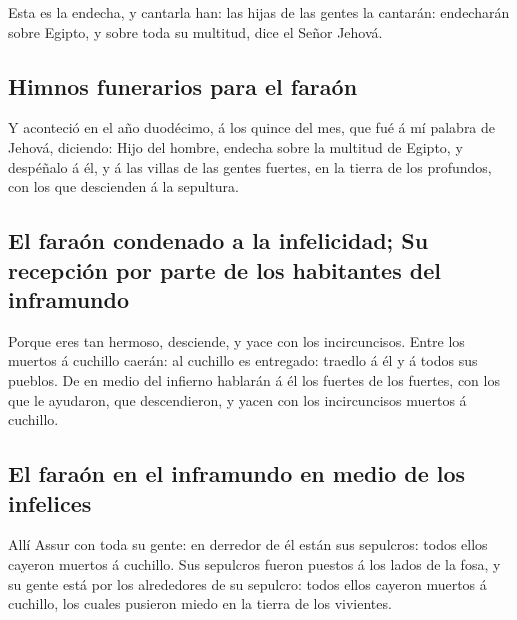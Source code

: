  Esta es la endecha, y cantarla han: las hijas de las
gentes la cantarán: endecharán sobre Egipto, y sobre toda su multitud,
dice el Señor Jehová.

\hypertarget{himnos-funerarios-para-el-farauxf3n}{%
\subsection{Himnos funerarios para el
faraón}\label{himnos-funerarios-para-el-farauxf3n}}

 Y aconteció en el año duodécimo, á los quince del mes, que
fué á mí palabra de Jehová, diciendo:  Hijo del hombre,
endecha sobre la multitud de Egipto, y despéñalo á él, y á las villas de
las gentes fuertes, en la tierra de los profundos, con los que
descienden á la sepultura.

\hypertarget{el-farauxf3n-condenado-a-la-infelicidad-su-recepciuxf3n-por-parte-de-los-habitantes-del-inframundo}{%
\subsection{El faraón condenado a la infelicidad; Su recepción por parte
de los habitantes del
inframundo}\label{el-farauxf3n-condenado-a-la-infelicidad-su-recepciuxf3n-por-parte-de-los-habitantes-del-inframundo}}

 Porque eres tan hermoso, desciende, y yace con los
incircuncisos.  Entre los muertos á cuchillo caerán: al
cuchillo es entregado: traedlo á él y á todos sus pueblos. 
De en medio del infierno hablarán á él los fuertes de los fuertes, con
los que le ayudaron, que descendieron, y yacen con los incircuncisos
muertos á cuchillo.

\hypertarget{el-farauxf3n-en-el-inframundo-en-medio-de-los-infelices}{%
\subsection{El faraón en el inframundo en medio de los
infelices}\label{el-farauxf3n-en-el-inframundo-en-medio-de-los-infelices}}

 Allí Assur con toda su gente: en derredor de él están sus
sepulcros: todos ellos cayeron muertos á cuchillo.  Sus
sepulcros fueron puestos á los lados de la fosa, y su gente está por los
alrededores de su sepulcro: todos ellos cayeron muertos á cuchillo, los
cuales pusieron miedo en la tierra de los vivientes.

